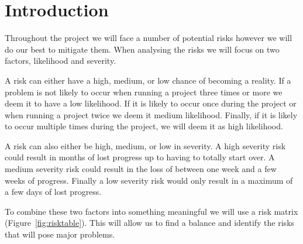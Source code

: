 \documentclass{report}   	%
\begin{document}
\section{Introduction}
Throughout the project we will face a number of potential risks however we will do our best to mitigate them.
When analysing the risks we will focus on two factors, likelihood and severity.

A risk can either have a high, medium, or low chance of becoming a reality.
If a problem is not likely to occur when running a project three times or more we deem it to have a low likelihood.
If it is likely to occur once during the project or when running a project twice we deem it medium likelihood.
Finally, if it is likely to occur multiple times during the project, we will deem it as high likelihood.

A risk can also either be high, medium, or low in severity.
A high severity risk could result in months of lost progress up to having to totally start over.
A medium severity risk could result in the loss of between one week and a few weeks of progress.
Finally a low severity risk would only result in a maximum of a few days of lost progress.

To combine these two factors into something meaningful we will use a risk matrix (Figure~\ref{fig:risktable}).
This will allow us to find a balance and identify the risks that will pose major problems.
\end{document}
